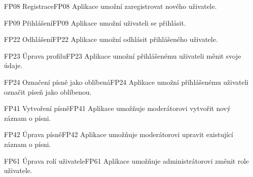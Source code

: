 \begin{requirment}{FP08 Registrace}{FP08}
    Aplikace umožní zaregistrovat nového uživatele.
\end{requirment}

\begin{requirment}{FP09 Přihlášení}{FP09}
    Aplikace umožní uživateli se přihlásit.
\end{requirment}

\begin{requirment}{FP22 Odhlášení}{FP22}
    Aplikace umožní odhlásit přihlášeného uživatele.
\end{requirment}

\begin{requirment}{FP23 Úprava profilu}{FP23}
    Aplikace umožní přihlášenému uživateli měnit svoje údaje.
\end{requirment}


\begin{requirment}{FP24 Označení písně jako oblíbená}{FP24}
    Aplikace umožní příhlášenému uživateli označit píseň jako oblíbenou.
\end{requirment}

\begin{requirment}{FP41 Vytvoření písně}{FP41}
    Aplikace umožňuje moderátorovi vytvořit nový záznam o písni.
\end{requirment}

\begin{requirment}{FP42 Úprava písně}{FP42}
    Aplikace umožňuje moderátorovi upravit existující záznam o písni.
\end{requirment}

\begin{requirment}{FP61 Úprava rolí uživatele}{FP61}
    Aplikace umožňuje administrátorovi změnit role uživatele.
\end{requirment}
